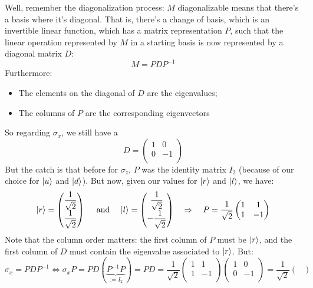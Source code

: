 \documentclass[solutions.tex]{subfiles}
\begin{document}
\begin{remark}
Well, remember the diagonalization process: $M$ diagonalizable
means that there's a basis where it's diagonal. That is, there's
a change of basis, which is an invertible linear function, which
has a matrix representation $P$, such that the linear operation
represented by $M$ in a starting basis is now represented by a
diagonal matrix $D$:
\[
	M = PDP^{-1}
\]
Furthermore:
\begin{itemize}
	\item The elements on the diagonal of $D$ are the eigenvalues;
	\item The columns of $P$ are the corresponding eigenvectors
\end{itemize}
So regarding $\sigma_x$, we still have a
\[
	D = \begin{pmatrix}
		1 & 0 \\
		0 & -1 \\
	\end{pmatrix}
\]
But the catch is that before for $\sigma_z$, $P$ was the identity
matrix $I_2$ (because of our choice for $|u\rangle$ and $|d\rangle$). But now,
given our values for $|r\rangle$ and $|l\rangle$, we have:
\[
	|r\rangle = \begin{pmatrix}
		\dfrac1{\sqrt2} \\
		\dfrac1{\sqrt2} \\
	\end{pmatrix}\quad\text{ and }\quad
	|l\rangle = \begin{pmatrix}
		\dfrac1{\sqrt2} \\
		-\dfrac1{\sqrt2} \\
	\end{pmatrix}\quad\Rightarrow\quad
	P = \frac1{\sqrt2} \begin{pmatrix}
		1 & 1 \\
		1 & -1 \\
	\end{pmatrix}
\]
Note that the column order matters: the first column of $P$ must
be $|r\rangle$, and the first column of $D$ must contain the eigenvalue
associated to $|r\rangle$. But:
\[
	\sigma_x = PDP^{-1} \Leftrightarrow
	\sigma_x P = PD(\underbrace{P^{-1}P}_{:=I_2}) = PD =
	\frac1{\sqrt2} \begin{pmatrix}
		1 & 1 \\
		1 & -1 \\
	\end{pmatrix}\begin{pmatrix}
		1 & 0 \\
		0 & -1 \\
	\end{pmatrix} = \frac1{\sqrt2}\begin{pmatrix}

\end{pmatrix}\]
\end{remark}
\end{document}
